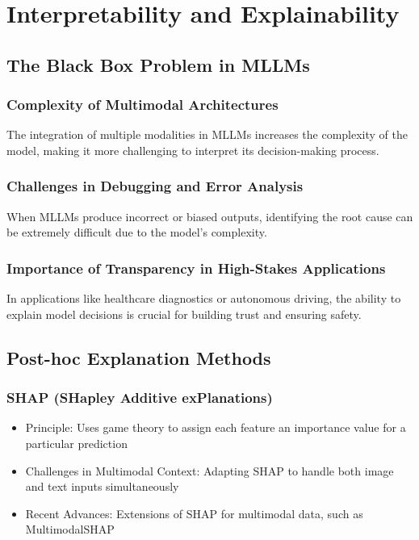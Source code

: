 \section{Interpretability and Explainability}

\subsection{The Black Box Problem in MLLMs}
\subsubsection{Complexity of Multimodal Architectures}
The integration of multiple modalities in MLLMs increases the complexity of the model, making it more challenging to interpret its decision-making process.

\subsubsection{Challenges in Debugging and Error Analysis}
When MLLMs produce incorrect or biased outputs, identifying the root cause can be extremely difficult due to the model's complexity.

\subsubsection{Importance of Transparency in High-Stakes Applications}
In applications like healthcare diagnostics or autonomous driving, the ability to explain model decisions is crucial for building trust and ensuring safety.

\subsection{Post-hoc Explanation Methods}
\subsubsection{SHAP (SHapley Additive exPlanations)}
\begin{itemize}
    \item Principle: Uses game theory to assign each feature an importance value for a particular prediction
    \item Challenges in Multimodal Context: Adapting SHAP to handle both image and text inputs simultaneously
    \item Recent Advances: Extensions of SHAP for multimodal data, such as MultimodalSHAP
\end{itemize}

